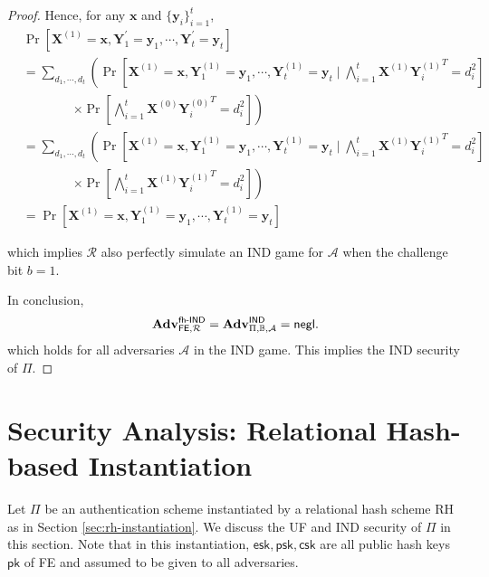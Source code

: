 \begin{proof}
Hence, for any $\mathbf{x}$ and $\{ \mathbf{y}_i \}_{i=1}^t$,
\begin{align*}
	& \Pr [\mathbf{X}^{(1)} = \mathbf{x}, \mathbf{Y}^\prime_1 = \mathbf{y}_1, \cdots, \mathbf{Y}^\prime_t = \mathbf{y}_t] \\
	&= \sum_{d_1, \cdots, d_t} \left( \Pr \left[\mathbf{X}^{(1)} = \mathbf{x}, \mathbf{Y}^{(1)}_1 = \mathbf{y}_1, \cdots, \mathbf{Y}^{(1)}_t = \mathbf{y}_t \mid \bigwedge_{i=1}^t \mathbf{X}^{(1)} {\mathbf{Y}^{(1)}_i}^T = d_i^2 \right] \right. \\
	&\qquad \qquad \left. \times \Pr \left[\bigwedge_{i=1}^t \mathbf{X}^{(0)} {\mathbf{Y}_i^{(0)}}^T = d_i^2 \right] \right) \\
	&= \sum_{d_1, \cdots, d_t} \left( \Pr \left[\mathbf{X}^{(1)} = \mathbf{x}, \mathbf{Y}^{(1)}_1 = \mathbf{y}_1, \cdots, \mathbf{Y}^{(1)}_t = \mathbf{y}_t \mid \bigwedge_{i=1}^t \mathbf{X}^{(1)} {\mathbf{Y}^{(1)}_i}^T = d_i^2 \right] \right. \\
	&\qquad \qquad \left. \times \Pr \left[\bigwedge_{i=1}^t \mathbf{X}^{(1)} {\mathbf{Y}_i^{(1)}}^T = d_i^2 \right] \right) \\
	&= \Pr[\mathbf{X}^{(1)} = \mathbf{x}, \mathbf{Y}^{(1)}_1 = \mathbf{y}_1, \cdots, \mathbf{Y}^{(1)}_t = \mathbf{y}_t ]
\end{align*}

\noindent which implies $\mathcal{R}$ also perfectly simulate an \textsf{IND} game for $\mathcal{A}$ when the challenge bit $b = 1$.

In conclusion, 
\[
	\mathbf{Adv}_{\textsf{FE}, \mathcal{R}}^\textsf{fh-IND} = \mathbf{Adv}_{\Pi, \mathbb{B}, \mathcal{A}}^\textsf{IND} = \mathsf{negl}.
\]
which holds for all adversaries $\mathcal{A}$ in the \textsf{IND} game. This implies the IND security of $\Pi$.


\end{proof}




\section{Security Analysis: Relational Hash-based Instantiation}
\label{sec:security_analysis:rh}

Let $\Pi$ be an authentication scheme instantiated by a relational hash scheme \textsf{RH} as in Section \ref{sec:rh-instantiation}. We discuss the UF and IND security of $\Pi$ in this section. Note that in this instantiation, $\textsf{esk}, \textsf{psk}, \textsf{csk}$ are all public hash keys $\textsf{pk}$ of \textsf{FE} and assumed to be given to all adversaries.

